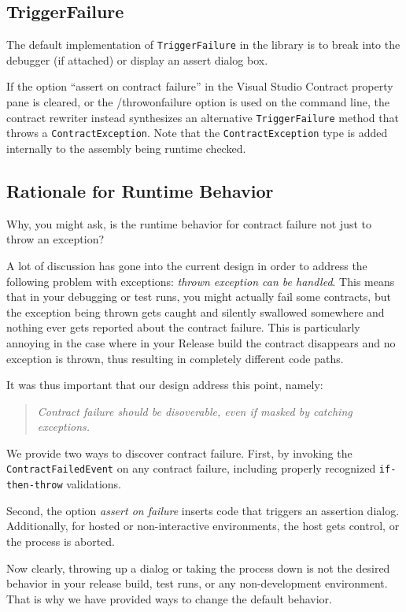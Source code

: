 \documentclass{article}
\newcommand{\code}[1]{\lstinline{#1}}
\begin{document}
\subsection{TriggerFailure}
The default implementation of \code{TriggerFailure} in the library is to
break into the debugger (if attached) or display an assert dialog
box. 

If the option ``assert on contract failure'' in the Visual Studio
Contract property pane is cleared, or the /throwonfailure option is
used on the command line, the contract rewriter instead synthesizes an
alternative \code{TriggerFailure} method that throws a
\code{ContractException}.  Note that the \code{ContractException} type
is added internally to the assembly being runtime checked.

\subsection{Rationale for Runtime Behavior}

Why, you might ask, is the runtime behavior for contract failure not
just to throw an exception?

A lot of discussion has gone into the
current design in order to address the following problem with
exceptions: \emph{thrown exception can be handled}. This means that in
your debugging or test runs, you might actually fail some contracts,
but the exception being thrown gets caught and silently swallowed
somewhere and nothing ever gets reported about the contract
failure. This is particularly annoying in the case where in your
Release build the contract disappears and no exception is thrown, thus
resulting in completely different code paths. 

\noindent It was thus important that our design address this point, namely:
\begin{quote}
\emph{Contract failure should be disoverable, even if masked by catching exceptions.}
\end{quote}
We provide two ways to discover contract failure. First, by invoking
the \code{ContractFailedEvent} on any contract failure, including
properly recognized \code{if-then-throw} validations.

Second, the option \emph{assert on failure} inserts code that triggers
an assertion dialog. Additionally, for hosted or non-interactive
environments, the host gets control, or the process is aborted.

Now clearly, throwing up a dialog or taking the process down is not
the desired behavior in your release build, test runs, or any non-development
environment. That is why we have provided ways to change the default
behavior. 
\end{document}
